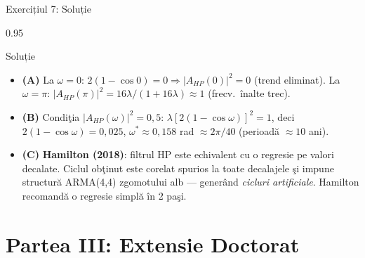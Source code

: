 \documentclass[9pt, aspectratio=169, t]{beamer}
\begin{document}
\begin{frame}{Exercițiul 7: Soluție}
    \begin{cminipage}{0.95\textwidth}
    \begin{exampleblock}{Soluție}
        {\footnotesize
        \begin{itemize}\setlength{\itemsep}{0pt}
            \item \textcolor{MainBlue}{\textbf{(A)}} La $\omega=0$: $2(1-\cos 0)=0 \Rightarrow |A_{HP}(0)|^2=0$ (trend eliminat).
            La $\omega=\pi$: $|A_{HP}(\pi)|^2 = 16\lambda/(1+16\lambda)\approx 1$ (frecv.\ înalte trec).
            \item \textcolor{MainBlue}{\textbf{(B)}} Condiţia $|A_{HP}(\omega)|^2=0{,}5$: $\lambda[2(1-\cos\omega)]^2=1$, deci
            $2(1-\cos\omega)=0{,}025$, $\omega^*\approx 0{,}158$ rad $\approx 2\pi/40$ (perioadă $\approx 10$ ani).
            \item \textcolor{MainBlue}{\textbf{(C)}} \textbf{Hamilton (2018)}: filtrul HP este echivalent cu o regresie pe valori decalate. Ciclul obţinut este corelat spurios la toate decalajele şi impune structură ARMA(4,4) zgomotului alb --- generând \emph{cicluri artificiale}. Hamilton recomandă o regresie simplă în 2 paşi.
        \end{itemize}
        }
    \end{exampleblock}
    \end{cminipage}
\end{frame}

\section{Partea III: Extensie Doctorat}
\end{document}
